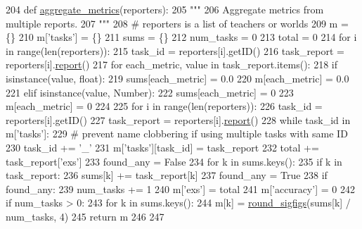 \begin{DoxyCode}
204 \textcolor{keyword}{def }\hyperlink{namespaceparlai_1_1core_1_1metrics_aa4ed5491962e06684b235fffe1b20fec}{aggregate\_metrics}(reporters):
205     \textcolor{stringliteral}{"""}
206 \textcolor{stringliteral}{    Aggregate metrics from multiple reports.}
207 \textcolor{stringliteral}{    """}
208     \textcolor{comment}{# reporters is a list of teachers or worlds}
209     m = \{\}
210     m[\textcolor{stringliteral}{'tasks'}] = \{\}
211     sums = \{\}
212     num\_tasks = 0
213     total = 0
214     \textcolor{keywordflow}{for} i \textcolor{keywordflow}{in} range(len(reporters)):
215         task\_id = reporters[i].getID()
216         task\_report = reporters[i].\hyperlink{namespaceprojects_1_1convai2_1_1eval__f1_a01a47b9c08dad189837a51f085defc45}{report}()
217         \textcolor{keywordflow}{for} each\_metric, value \textcolor{keywordflow}{in} task\_report.items():
218             \textcolor{keywordflow}{if} isinstance(value, float):
219                 sums[each\_metric] = 0.0
220                 m[each\_metric] = 0.0
221             \textcolor{keywordflow}{elif} isinstance(value, Number):
222                 sums[each\_metric] = 0
223                 m[each\_metric] = 0
224 
225     \textcolor{keywordflow}{for} i \textcolor{keywordflow}{in} range(len(reporters)):
226         task\_id = reporters[i].getID()
227         task\_report = reporters[i].\hyperlink{namespaceprojects_1_1convai2_1_1eval__f1_a01a47b9c08dad189837a51f085defc45}{report}()
228         \textcolor{keywordflow}{while} task\_id \textcolor{keywordflow}{in} m[\textcolor{stringliteral}{'tasks'}]:
229             \textcolor{comment}{# prevent name clobbering if using multiple tasks with same ID}
230             task\_id += \textcolor{stringliteral}{'\_'}
231         m[\textcolor{stringliteral}{'tasks'}][task\_id] = task\_report
232         total += task\_report[\textcolor{stringliteral}{'exs'}]
233         found\_any = \textcolor{keyword}{False}
234         \textcolor{keywordflow}{for} k \textcolor{keywordflow}{in} sums.keys():
235             \textcolor{keywordflow}{if} k \textcolor{keywordflow}{in} task\_report:
236                 sums[k] += task\_report[k]
237                 found\_any = \textcolor{keyword}{True}
238         \textcolor{keywordflow}{if} found\_any:
239             num\_tasks += 1
240     m[\textcolor{stringliteral}{'exs'}] = total
241     m[\textcolor{stringliteral}{'accuracy'}] = 0
242     \textcolor{keywordflow}{if} num\_tasks > 0:
243         \textcolor{keywordflow}{for} k \textcolor{keywordflow}{in} sums.keys():
244             m[k] = \hyperlink{namespaceparlai_1_1agents_1_1legacy__agents_1_1seq2seq_1_1utils__v0_af377ec61bfc0423461e7b409ffc883b9}{round\_sigfigs}(sums[k] / num\_tasks, 4)
245     \textcolor{keywordflow}{return} m
246 
247 
\end{DoxyCode}
\mbox{\label{namespaceparlai_1_1core_1_1metrics_ae323045c05ed03d93c260521ebb8bf71}} 

